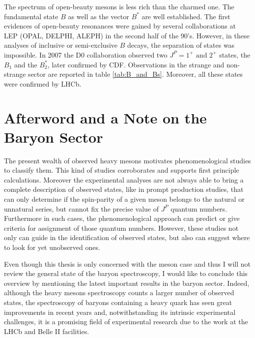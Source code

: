 The spectrum of open-beauty mesons is less rich than the charmed one. The fundamental state $B$ as well as the vector $B^*$ are well established. The first evidences of open-beauty resonances were gained by several collaborations at LEP (OPAL, DELPHI, ALEPH) in the second half of the 90's. However, in these analyses of inclusive or semi-exclusive $B$ decays, the separation of states was impossible. In 2007 the D0 collaboration observed two $J^P = 1^+ \text{ and } 2^+$ states, the $B_1$ and the $B^*_2$, later confirmed by CDF. Observations in the strange and non-strange sector are reported in table \ref{tab:B_and_Bs}. Moreover, all these states were confirmed by LHCb.

\section{Afterword and a Note on the Baryon Sector}

The present wealth of observed heavy mesons motivates phenomenological studies to classify them. This kind of studies corroborates and supports first principle calculations. Moreover the experimental analyses are not always able to bring a complete description of observed states, like in prompt production studies, that can only determine if the spin-parity of a given meson belongs to the natural or unnatural series, but cannot fix the precise value of $J^P$ quantum numbers. Furthermore in such cases, the phenomenological approach can predict or give criteria for assignment of those quantum numbers. However, these studies not only can guide in the identification of observed states, but also can suggest where to look for yet unobserved ones.

Even though this thesis is only concerned with the meson case and thus I will not review the general state of the baryon spectroscopy, I would like to conclude this overview by mentioning the latest important results in the baryon sector. Indeed, although the heavy mesons spectroscopy counts a larger number of observed states, the spectroscopy of baryons containing a heavy quark has seen great improvements in recent years and, notwithstanding its intrinsic experimental challenges, it is a promising field of experimental research due to the work at the LHCb and Belle II facilities. 

